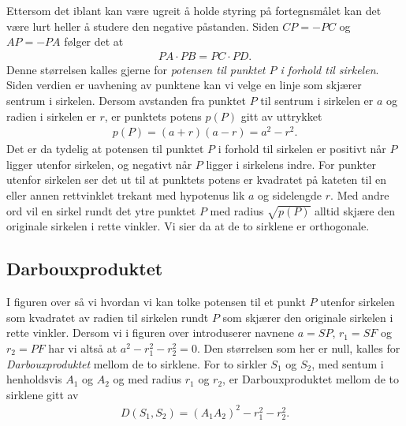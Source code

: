 \documentclass[norsk,twoside,utf8]{article}
\newcommand{\EQU}[1] { \begin{equation*} \begin{split} #1 \end{split} \end{equation*} }
\begin{document}
\noindent
Ettersom det iblant kan være ugreit å holde styring på fortegnsmålet kan det være lurt heller å studere den negative påstanden. Siden $CP=-PC$ og $AP=-PA$ følger det at
\EQU{
PA \cdot PB = PC \cdot PD. 
}
Denne størrelsen kalles gjerne for \textit{potensen til punktet $P$ i forhold til sirkelen}. Siden verdien er uavhening av punktene kan vi velge en linje som skjærer sentrum i sirkelen. Dersom avstanden fra punktet $P$ til sentrum i sirkelen er $a$ og radien i sirkelen er $r$, er punktets potens $p(P)$ gitt av uttrykket
\EQU{
p(P)=(a+r)(a-r)=a^2-r^2.
}
Det er da tydelig at potensen til punktet $P$ i forhold til sirkelen er positivt når $P$ ligger utenfor sirkelen, og negativt når $P$ ligger i sirkelens indre. For punkter utenfor sirkelen ser det ut til at punktets potens er kvadratet på kateten til en eller annen rettvinklet trekant med hypotenus lik $a$ og sidelengde $r$. Med andre ord vil en sirkel rundt det ytre punktet $P$ med radius $\sqrt{p(P)}$ alltid skjære den originale sirkelen i rette vinkler. Vi sier da at de to sirklene er orthogonale.

\begin{center}
\end{center}


\subsection{Darbouxproduktet}
I figuren over så vi hvordan vi kan tolke potensen til et punkt $P$ utenfor sirkelen som kvadratet av radien til sirkelen rundt $P$ som skjærer den originale sirkelen i rette vinkler. Dersom vi i figuren over introduserer navnene $a=SP$, $r_1 = SF$ og $r_2 = PF$ har vi altså at $a^2-r_1^2-r_2^2=0$. Den størrelsen som her er null, kalles for \textit{Darbouxproduktet} mellom de to sirklene. For to sirkler $S_1$ og $S_2$, med sentum i henholdsvis $A_1$ og $A_2$ og med radius $r_1$ og $r_2$, er Darbouxproduktet mellom de to sirklene gitt av
\EQU{
D(S_1,S_2) = (A_1 A_2)^2-r_1^2-r_2^2.
}
\end{document}
